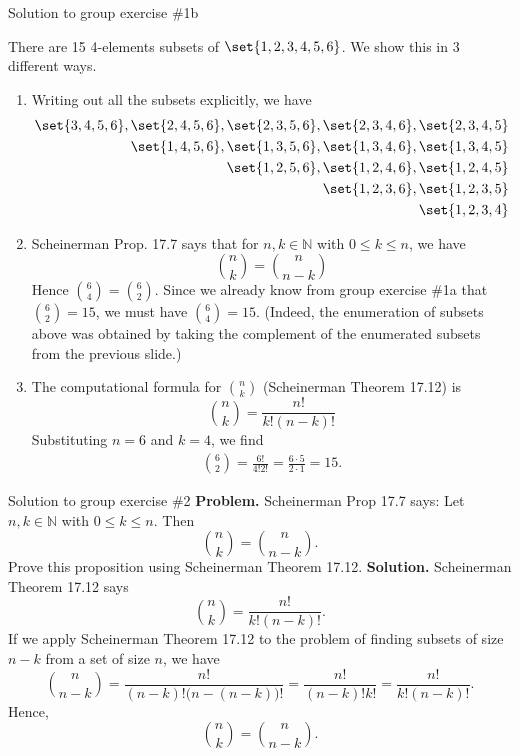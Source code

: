 \documentclass[10pt]{beamer}
\begin{document}
\begin{frame}{Solution to group exercise \#1b}
\footnotesize

 There are 15 4-elements subsets of $\set{1,2,3,4,5,6}$.  We show this in 3 different ways. 
\begin{enumerate} 
	\item Writing out all the subsets explicitly, we have
%
\begin{align*}
\set{3,4,5,6}, \set{2,4,5,6}, \set{2,3,5,6}, \set{2,3,4,6}, \set{2,3,4,5} \\
\set{1,4,5,6}, \set{1,3,5,6}, \set{1,3,4,6}, \set{1,3,4,5} \\
\set{1,2,5,6}, \set{1,2,4,6}, \set{1,2,4,5} \\
\set{1,2,3,6}, \set{1,2,3,5} \\
\set{1,2,3,4} 
\end{align*}
%
\item Scheinerman Prop. 17.7  says that for $n,k \in \mathbb{N}$ with $0 \leq k \leq n$, we have  
\[ \binom{n}{k} = \binom{n}{n-k}\]
Hence  $\binom{6}{4} = \binom{6}{2}$. Since we already know from group exercise \#1a that $\binom{6}{2}=15$, we must have  $\binom{6}{4}=15$. (Indeed, the enumeration of subsets above was obtained by taking the complement of the enumerated subsets from the previous slide.) 
\item The computational formula for $\binom{n}{k}$ (Scheinerman Theorem 17.12) is 
\[ \binom{n}{k}  = \frac{n!}{k! (n-k)!}\] 
Substituting $n=6$ and $k=4$, we find
%
\begin{align*}
\binom{6}{2} = \frac{6!}{4!2!} = \frac{6 \cdot 5}{2 \cdot 1} = 15. 
\end{align*}
\end{enumerate}
\end{frame}

\begin{frame}{Solution to group exercise \#2}
\textbf{Problem.} Scheinerman Prop 17.7 says: Let $n,k \in \mathbb{N}$ with $0 \leq k \leq n$.  Then 
		\[ \binom{n}{k} = \binom{n}{n-k}. \]
	Prove this proposition using Scheinerman  Theorem 17.12. 
\vfill 
\textbf{Solution.} Scheinerman  Theorem 17.12 says
		\[ \binom{n}{k} = \frac{n!}{k!(n-k)!}. \] 
	If we apply Scheinerman  Theorem 17.12 to the problem of finding subsets of size $n-k$ from a set of size $n$, we have
	\[ \binom{n}{n-k} = \frac{n!}{(n-k)!\big(n-(n-k) \big)!} = \frac{n!}{(n-k)!k!} = \frac{n!}{k!(n-k)!}.  \]
Hence,
\[ \binom{n}{k} = \binom{n}{n-k}. \]
			
\end{frame}
\end{document}
